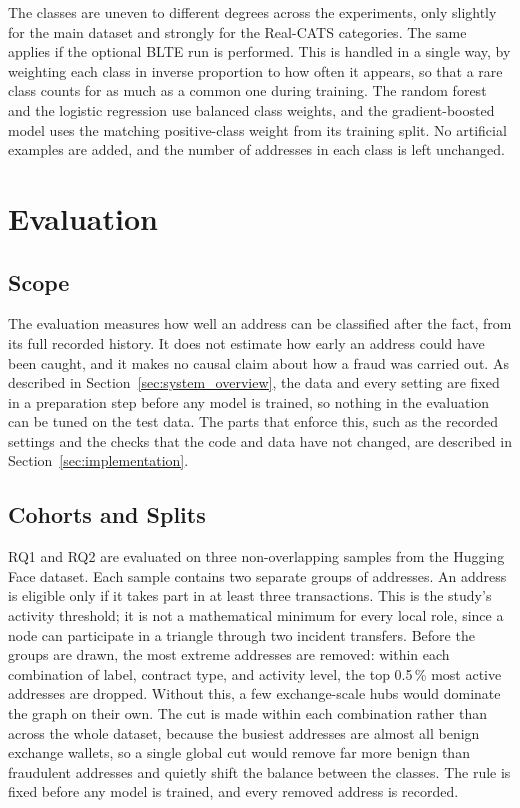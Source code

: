 \documentclass{thesisclass}
\begin{document}
The classes are uneven to different degrees across the experiments, only
slightly for the main dataset and strongly for the Real-CATS categories. The
same applies if the optional BLTE run is performed. This is handled in a single
way, by weighting each class in inverse proportion to how often it appears, so
that a rare class counts for as much as a common one during training. The random
forest and the logistic regression use balanced class weights, and the
gradient-boosted model uses the matching positive-class weight from its training
split. No artificial examples are added, and the number of addresses in each
class is left unchanged.

\section{Evaluation}
\label{sec:evaluation_protocol}

\subsection{Scope}

The evaluation measures how well an address can be classified after the fact, from
its full recorded history. It does not estimate how early an address could have
been caught, and it makes no causal claim about how a fraud was carried out. As
described in Section~\ref{sec:system_overview}, the data and every setting are
fixed in a preparation step before any model is trained, so nothing in the
evaluation can be tuned on the test data. The parts that enforce this, such as the
recorded settings and the checks that the code and data have not changed, are
described in Section~\ref{sec:implementation}.

\subsection{Cohorts and Splits}

RQ1 and RQ2 are evaluated on three non-overlapping samples from the Hugging Face
dataset. Each sample contains two separate groups of addresses. An address is
eligible only if it takes part in at least three transactions. This is the
study's activity threshold; it is not a mathematical minimum for every local
role, since a node can participate in a triangle through two incident transfers.
Before the groups are drawn, the
most extreme addresses are removed: within each combination of label, contract
type, and activity level, the top 0.5\,\% most active addresses are dropped.
Without this, a few exchange-scale hubs would dominate the graph on their own. The
cut is made within each combination rather than across the whole dataset, because
the busiest addresses are almost all benign exchange wallets, so a single global
cut would remove far more benign than fraudulent addresses and quietly shift the
balance between the classes. The rule is fixed before any model is trained, and
every removed address is recorded.
\end{document}
